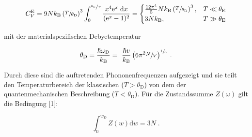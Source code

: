 \begin{equation}
    C_V^\text{E} = 9Nk_\text{B} \left(\sfrac{T}{\theta_\text{D}}\right)^3 \int_0^{\sfrac{\theta_\text{D}}{T}} 
    \frac{x^4\text{e}^x \; \text{d}x}{(\text{e}^x - 1)^2} = 
    \begin{cases}
        \frac{12\pi^4}{5}Nk_\text{B}\left(\sfrac{T}{\theta_\text{D}}\right)^3, & T \ll \theta_\text{E} \\
        3Nk_\text{B} , & T \gg \theta_\text{E}
    \end{cases}
\end{equation}

mit der materialspezifischen Debyetemperatur 

\begin{equation}
    \label{eqn:Debye}
    \theta_\text{D} = \frac{\hbar\omega_\text{D}}{k_\text{B}} = \
    \frac{\hbar v}{k_\text{B}} \left(6\pi^2\sfrac{N}{V}\right)^{\sfrac{1}{3}} \; .
\end{equation}

Durch diese sind die auftretenden Phononenfrequenzen aufgezeigt und sie teilt den Temperaturbereich der klassischen ($T > \theta_\text{D}$)
von dem der quantenmechanischen Beschreibung ($T < \theta_\text{D}$).
Für die Zustandssumme $Z(\omega)$ gilt die Bedingung [1]:

\begin{equation}
    \label{eqn:Natome}
    \int_0^{w_D} Z\left(w\right)\text{d}w = 3N \; .
\end{equation}
